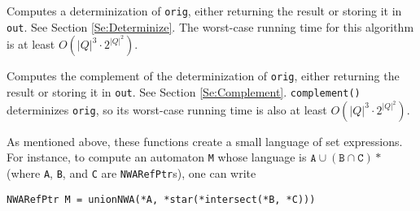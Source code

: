 \begin{functionlist}
    Computes a determinization of \texttt{orig}, either returning the
    result or storing it in \texttt{out}.
    See Section \ref{Se:Determinize}. The worst-case running time for this
    algorithm is at least $O({|Q|^3} \cdot2^{|Q|^2})$.

\clearpage
    Computes the complement of the determinization of \texttt{orig},
    either returning the result or storing it in \texttt{out}.
    See Section
    \ref{Se:Complement}. %
    \texttt{complement()} determinizes \texttt{orig}, so its worst-case
    running time is also at least $O({|Q|^3} \cdot2^{|Q|^2})$.


\end{functionlist}

As mentioned above, these functions create a small language of set
expressions. For instance, to compute an automaton \texttt{M} whose language
is $\texttt{A} \cup (\texttt{B} \cap \texttt{C})*$ (where \texttt{A},
\texttt{B}, and \texttt{C} are \texttt{NWARefPtr}s), one can write
\begin{center}
  \texttt{NWARefPtr M = unionNWA(*A, *star(*intersect(*B, *C)))}
\end{center}


